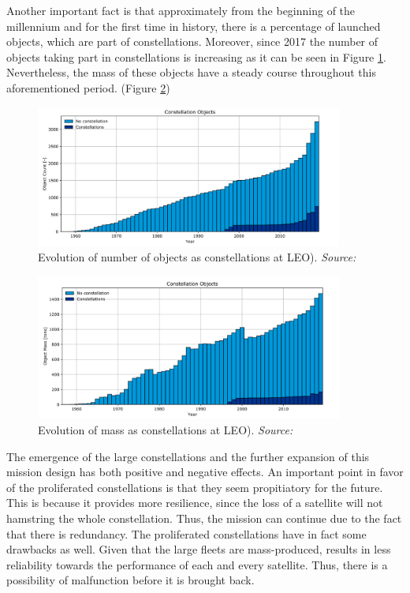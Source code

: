 Another important fact is that approximately from the beginning of the millennium and for the first time in history, there is a percentage of launched objects, which are part of constellations. Moreover, since 2017 the number of objects taking part in constellations is increasing as it can be seen in Figure \ref{constellation_count_LEO}. Nevertheless, the mass of these objects have a steady course throughout this aforementioned period. (Figure \ref{constellation_mass_LEO})

\begin{figure}
\centering
\includegraphics[width=0.9\textwidth]{Images/constellation_count_LEO.png}\caption{Evolution of number of objects as constellations at LEO). \textit{Source: \cite{ESA 2019}}}
\label{constellation_count_LEO} 
\end{figure}

\begin{figure}
\centering
\includegraphics[width=0.9\textwidth]{Images/constellation_mass_LEO.png}\caption{Evolution of mass as constellations at LEO). \textit{Source: \cite{ESA 2019}}}
\label{constellation_mass_LEO} 
\end{figure}

The emergence of the large constellations and the further expansion of this mission design has both positive and negative effects. An important point in favor of the proliferated constellations is that they seem propitiatory for the future. This is because it provides more resilience, since the loss of a satellite will not hamstring the whole constellation. Thus, the mission can continue due to the fact that there is redundancy. The proliferated constellations have in fact some drawbacks as well. Given that the large fleets are mass-produced, results in less reliability towards the performance of each and every satellite. Thus, there is a possibility of malfunction before it is brought back. 

